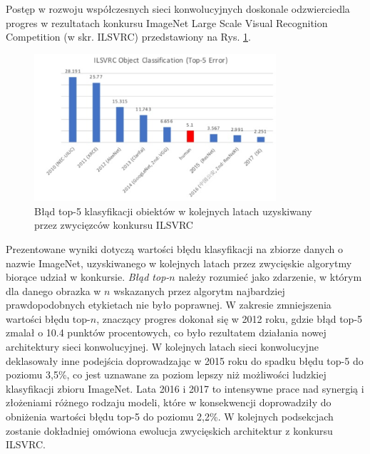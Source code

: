 Postęp w rozwoju współczesnych sieci konwolucyjnych doskonale odzwierciedla progres w rezultatach konkursu ImageNet Large Scale Visual Recognition Competition (w skr. ILSVRC) przedstawiony na Rys. \ref{ILSVRC}.
\begin{figure}[h!]
	\centering
	\includegraphics[width=0.8\textwidth]{figures/ILSVRC.png}
	\caption{Błąd top-5 klasyfikacji obiektów w kolejnych latach uzyskiwany przez zwycięzców konkursu ILSVRC}
	\label{ILSVRC}
\end{figure}
Prezentowane wyniki dotyczą wartości błędu klasyfikacji na zbiorze danych \cite{imagenet_cvpr09} o nazwie ImageNet, uzyskiwanego w kolejnych latach przez zwycięskie algorytmy biorące udział w konkursie. \textit{Błąd top-$n$} należy rozumieć jako zdarzenie, w którym dla danego obrazka w $n$ wskazanych przez algorytm najbardziej prawdopodobnych etykietach nie było poprawnej. W zakresie zmniejszenia wartości błędu top-$n$, znaczący progres dokonał się w 2012 roku, gdzie błąd top-5 zmalał o 10.4 punktów procentowych, co było rezultatem działania nowej architektury sieci konwolucyjnej. W kolejnych latach sieci konwolucyjne deklasowały inne podejścia doprowadzając w 2015 roku do spadku błędu top-5 do poziomu 3,5\%, co jest uznawane za poziom lepszy niż możliwości ludzkiej klasyfikacji zbioru ImageNet. Lata 2016 i 2017 to intensywne prace nad synergią i złożeniami różnego rodzaju modeli, które w konsekwencji doprowadziły do obniżenia wartości błędu top-5 do poziomu 2,2\%. W kolejnych podsekcjach zostanie dokładniej omówiona ewolucja zwycięskich architektur z konkursu ILSVRC. 

